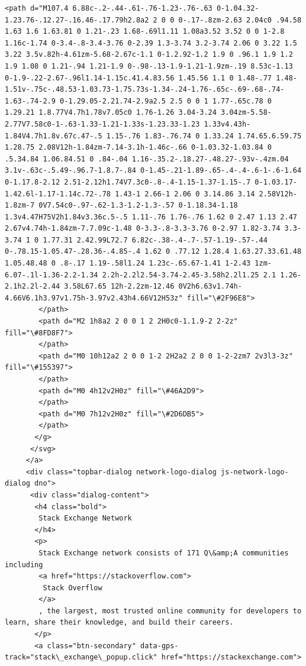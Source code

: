 \documentclass[11pt]{article}
\begin{document}
\begin{Verbatim}[commandchars=\\\{\}]
        <path d="M107.4 6.88c-.2-.44-.61-.76-1.23-.76-.63 0-1.04.32-1.23.76-.12.27-.16.46-.17.79h2.8a2 2 0 0 0-.17-.8zm-2.63 2.04c0 .94.58 1.63 1.6 1.63.81 0 1.21-.23 1.68-.69l1.11 1.08a3.52 3.52 0 0 1-2.8 1.16c-1.74 0-3.4-.8-3.4-3.76 0-2.39 1.3-3.74 3.2-3.74 2.06 0 3.22 1.5 3.22 3.5v.82h-4.61zm-5.68-2.67c-1.1 0-1.2.92-1.2 1.9 0 .96.1 1.9 1.2 1.9 1.08 0 1.21-.94 1.21-1.9 0-.98-.13-1.9-1.21-1.9zm-.19 8.53c-1.13 0-1.9-.22-2.67-.96l1.14-1.15c.41.4.83.56 1.45.56 1.1 0 1.48-.77 1.48-1.51v-.75c-.48.53-1.03.73-1.75.73s-1.34-.24-1.76-.65c-.69-.68-.74-1.63-.74-2.9 0-1.29.05-2.21.74-2.9a2.5 2.5 0 0 1 1.77-.65c.78 0 1.29.21 1.8.77V4.7h1.78v7.05c0 1.76-1.26 3.04-3.24 3.04zm-5.58-2.77V7.58c0-1-.63-1.33-1.21-1.33s-1.23.33-1.23 1.33v4.43h-1.84V4.7h1.8v.67c.47-.5 1.15-.76 1.83-.76.74 0 1.33.24 1.74.65.6.59.75 1.28.75 2.08V12h-1.84zm-7.14-3.1h-1.46c-.66 0-1.03.32-1.03.84 0 .5.34.84 1.06.84.51 0 .84-.04 1.16-.35.2-.18.27-.48.27-.93v-.4zm.04 3.1v-.63c-.5.49-.96.7-1.8.7-.84 0-1.45-.21-1.89-.65-.4-.4-.6-1-.6-1.64 0-1.17.8-2.12 2.51-2.12h1.74V7.3c0-.8-.4-1.15-1.37-1.15-.7 0-1.03.17-1.42.6l-1.17-1.14c.72-.78 1.43-1 2.66-1 2.06 0 3.14.86 3.14 2.58V12h-1.8zm-7 0V7.54c0-.97-.62-1.3-1.2-1.3-.57 0-1.18.34-1.18 1.3v4.47H75V2h1.84v3.36c.5-.5 1.11-.76 1.76-.76 1.62 0 2.47 1.13 2.47 2.67v4.74h-1.84zm-7.7.09c-1.48 0-3.3-.8-3.3-3.76 0-2.97 1.82-3.74 3.3-3.74 1 0 1.77.31 2.42.99L72.7 6.82c-.38-.4-.7-.57-1.19-.57-.44 0-.78.15-1.05.47-.28.36-.4.85-.4 1.62 0 .77.12 1.28.4 1.63.27.33.61.48 1.05.48.48 0 .8-.17 1.19-.58l1.24 1.23c-.65.67-1.41 1-2.43 1zm-6.07-.1l-1.36-2.2-1.34 2.2h-2.2l2.54-3.74-2.45-3.58h2.2l1.25 2.1 1.26-2.1h2.2l-2.44 3.58L67.65 12h-2.2zm-12.46 0V2h6.63v1.74h-4.66V6.1h3.97v1.75h-3.97v2.43h4.66V12H53z" fill="\#2F96E8">
        </path>
        <path d="M2 1h8a2 2 0 0 1 2 2H0c0-1.1.9-2 2-2z" fill="\#8FD8F7">
        </path>
        <path d="M0 10h12a2 2 0 0 1-2 2H2a2 2 0 0 1-2-2zm7 2v3l3-3z" fill="\#155397">
        </path>
        <path d="M0 4h12v2H0z" fill="\#46A2D9">
        </path>
        <path d="M0 7h12v2H0z" fill="\#2D6DB5">
        </path>
       </g>
      </svg>
     </a>
     <div class="topbar-dialog network-logo-dialog js-network-logo-dialog dno">
      <div class="dialog-content">
       <h4 class="bold">
        Stack Exchange Network
       </h4>
       <p>
        Stack Exchange network consists of 171 Q\&amp;A communities including
        <a href="https://stackoverflow.com">
         Stack Overflow
        </a>
        , the largest, most trusted online community for developers to learn, share their knowledge, and build their careers.
       </p>
       <a class="btn-secondary" data-gps-track="stack\_exchange\_popup.click" href="https://stackexchange.com">

\end{Verbatim}
\end{document}
